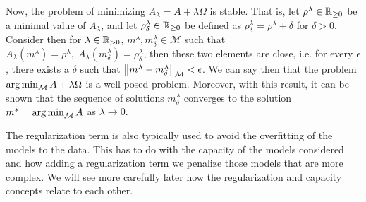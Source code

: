 Now, the problem of minimizing $A_\lambda = A + \lambda \Omega$ is stable. That is, let $\rho^\lambda \in \mathbb{R}_{\geq 0}$ be a minimal value of $A_\lambda$, and let $\rho^\lambda_\delta \in \mathbb{R}_{\geq 0}$ be defined as $\rho^\lambda_\delta = \rho^\lambda + \delta$ for $\delta > 0$. Consider then for $\lambda \in \mathbb{R}_{> 0}$, $m^\lambda, m^\lambda_\delta \in \mathcal{M}$ such that $A_\lambda(m^\lambda) = \rho^\lambda, \; A_\lambda(m^\lambda_\delta) = \rho^\lambda_\delta$, then these two elements are close, i.e. for every $\epsilon$, there exists a $\delta$ such that $\left\lVert m^\lambda - m^\lambda_\delta\right\rVert_{\mathcal{M}} < \epsilon$.
%
We can say then that the problem $\operatorname*{arg\min}_{\mathcal{M}} A + \lambda \Omega$ is a well-posed problem. 
%
Moreover, with this result, it can be shown that the sequence of solutions $m^\lambda_\delta$ converges to the solution $m^* = \operatorname*{arg\min}_{\mathcal{M}} A$ as $\lambda \to 0$.
%

The regularization term is also typically used to avoid the overfitting of the models to the data. This has to do with the capacity of the models considered and how adding a regularization term we penalize those models that are more complex. We will see more carefully later how the regularization and capacity concepts relate to each other.





